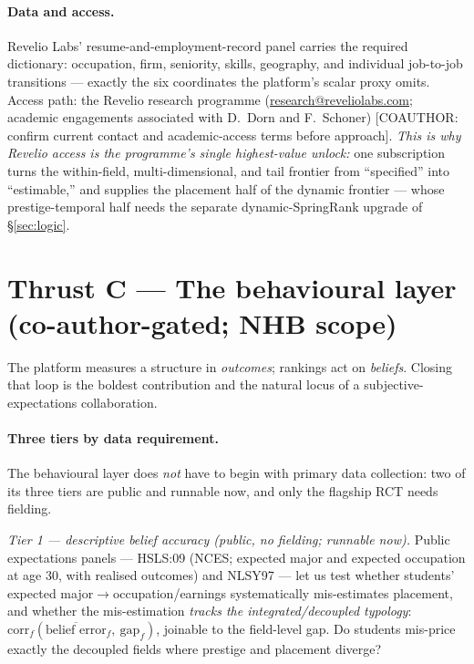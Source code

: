 \documentclass[11pt]{article}
\newcommand{\coauthor}[1]{\textcolor{blue!60!black}{[COAUTHOR: #1]}}
\begin{document}
\paragraph{Data and access.} Revelio Labs' resume-and-employment-record panel carries the required dictionary:
occupation, firm, seniority, skills, geography, and individual job-to-job transitions --- exactly the six
coordinates the platform's scalar proxy omits. Access path: the Revelio research programme
(\href{mailto:research@reveliolabs.com}{research@reveliolabs.com}; academic engagements associated with
D.~Dorn and F.~Schoner) \coauthor{confirm current contact and academic-access terms before approach}. \emph{This
is why Revelio access is the programme's single highest-value unlock:} one subscription turns the within-field,
multi-dimensional, and tail frontier from ``specified'' into ``estimable,'' and supplies the placement half of the
dynamic frontier --- whose prestige-temporal half needs the separate dynamic-SpringRank upgrade of \S\ref{sec:logic}.

\section{Thrust C --- The behavioural layer (co-author-gated; NHB scope)}\label{sec:thrustC}
The platform measures a structure in \emph{outcomes}; rankings act on \emph{beliefs}. Closing that loop is the
boldest contribution and the natural locus of a subjective-expectations collaboration.

\paragraph{Three tiers by data requirement.} The behavioural layer does \emph{not} have to begin with primary data
collection: two of its three tiers are public and runnable now, and only the flagship RCT needs fielding.

\emph{Tier 1 --- descriptive belief accuracy (public, no fielding; runnable now).} Public expectations panels ---
HSLS:09 (NCES; expected major and expected occupation at age 30, with realised outcomes) and NLSY97 --- let us test
whether students' expected major$\to$occupation/earnings systematically mis-estimates placement, and whether the
mis-estimation \emph{tracks the integrated/decoupled typology}:
$\mathrm{corr}_f\!\left(\overline{\text{belief error}}_f,\ \mathrm{gap}_f\right)$, joinable to the field-level gap.
Do students mis-price exactly the decoupled fields where prestige and placement diverge?
\end{document}
